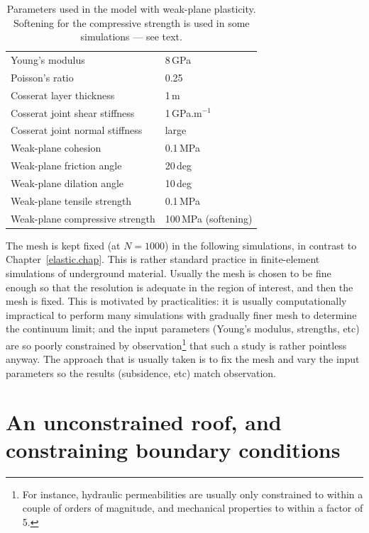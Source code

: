 \documentclass[]{scrreprt}
\begin{document}
\begin{table}[htb]
\begin{center}
\begin{tabular}{ll}
Young's modulus & 8\,GPa \\
Poisson's ratio & 0.25 \\
Cosserat layer thickness & 1\,m \\
Cosserat joint shear stiffness & 1\,GPa.m$^{-1}$ \\
Cosserat joint normal stiffness & large \\
Weak-plane cohesion & 0.1\,MPa \\
Weak-plane friction angle & 20\,deg \\
Weak-plane dilation angle & 10\,deg \\
Weak-plane tensile strength & 0.1\,MPa \\
Weak-plane compressive strength & 100\,MPa (softening)
\end{tabular}
\caption{Parameters used in the model with weak-plane plasticity.
  Softening for the compressive strength is used in some simulations
  --- see text.}
\label{wp.params.tab}
\end{center}
\end{table}

The mesh is kept fixed (at $N=1000$) in the following simulations, in
contrast to Chapter~\ref{elastic.chap}.  This is rather standard practice in
finite-element simulations of underground material.  Usually the mesh
is chosen to be fine enough so that the resolution is adequate in the
region of interest, and then the mesh is fixed.  This is
motivated by practicalities: it is usually computationally impractical
to perform many simulations with gradually finer mesh to determine the
continuum limit; and the input parameters (Young's modulus, strengths,
etc) are so poorly constrained by observation\footnote{For instance,
  hydraulic permeabilities are usually only constrained to within a
  couple of orders of magnitude, and mechanical properties to within a
  factor of 5.}  that such a study is rather pointless anyway.  The
approach that is usually taken is to fix the mesh and vary the input
parameters so the results (subsidence, etc) match observation.

\section{An unconstrained roof, and constraining boundary conditions}
\label{bc.constrain.sec}
\end{document}
